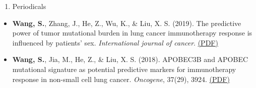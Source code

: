 \documentclass[10pt,]{article}
\providecommand{\tightlist}{%
  \setlength{\itemsep}{0pt}\setlength{\parskip}{0pt}}
\begin{document}
\begin{enumerate}
\def\labelenumi{\arabic{enumi}.}
\tightlist
\item
  Periodicals
\end{enumerate}

\begin{itemize}
\tightlist
\item
  \textbf{Wang, S.}, Zhang, J., He, Z., Wu, K., \& Liu, X. S. (2019).
  The predictive power of tumor mutational burden in lung cancer
  immunotherapy response is influenced by patients' sex.
  \emph{International journal of cancer}.
  \href{https://www.researchgate.net/publication/332372671_The_predictive_power_of_tumor_mutational_burden_in_lung_cancer_immunotherapy_response_is_influenced_by_patients'_sex}{(PDF)}
\item
  \textbf{Wang, S.}, Jia, M., He, Z., \& Liu, X. S. (2018). APOBEC3B and
  APOBEC mutational signature as potential predictive markers for
  immunotherapy response in non-small cell lung cancer. \emph{Oncogene},
  37(29), 3924.
  \href{https://www.researchgate.net/publication/324781475_APOBEC3B_and_APOBEC_mutational_signature_as_potential_predictive_markers_for_immunotherapy_response_in_non-small_cell_lung_cancer}{(PDF)}
\end{itemize}
\end{document}
